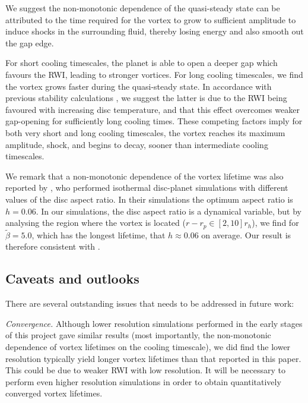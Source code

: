 
We suggest the non-monotonic dependence of the quasi-steady state can
be attributed to the time required for the vortex to grow to 
sufficient amplitude to induce shocks in the surrounding fluid,
thereby losing energy and also smooth out the gap edge.   

For short cooling timescales, the planet is able to open a
deeper gap which favours the RWI, leading to stronger 
vortices. For long cooling timescales, we find the vortex
grows faster during the quasi-steady state. In accordance with
previous stability calculations \citep{li00}, we 
suggest the latter is due to the RWI being favoured with increasing
disc temperature, and that this effect overcomes weaker
gap-opening for sufficiently long cooling times. 
These competing factors imply
for both very short and long cooling timescales, the vortex reaches
its maximum amplitude, shock, and begins to decay, sooner than
intermediate cooling timescales.      


We remark that a non-monotonic dependence of the vortex lifetime was
also reported by \cite{fu14}, who performed isothermal disc-planet
simulations with different values of the   
disc aspect ratio. In their simulations the optimum aspect ratio is
$h=0.06$. In our simulations, the disc aspect ratio is a dynamical
variable, but by analysing the region where the vortex is located
($r-r_p\in[2,10]r_h$), %
we find for $\tilde\beta=5.0$, which has the longest lifetime, that 
$h\approx0.06$ on average.  
Our result is therefore consistent with \citep{fu14}. 


\subsection{Caveats and outlooks}
There are several outstanding issues that needs to be addressed
in future work: 

\emph{Convergence.} Although lower resolution simulations performed in
the early stages of this project gave similar results  
(most importantly, the non-monotonic dependence of vortex lifetimes on
the cooling timescale), we did find the lower resolution 
typically yield longer vortex lifetimes than that reported in this
paper. This could be due to weaker RWI with low resolution.  
It will be necessary to perform even higher resolution  simulations
in order to obtain quantitatively converged vortex lifetimes.  
 
